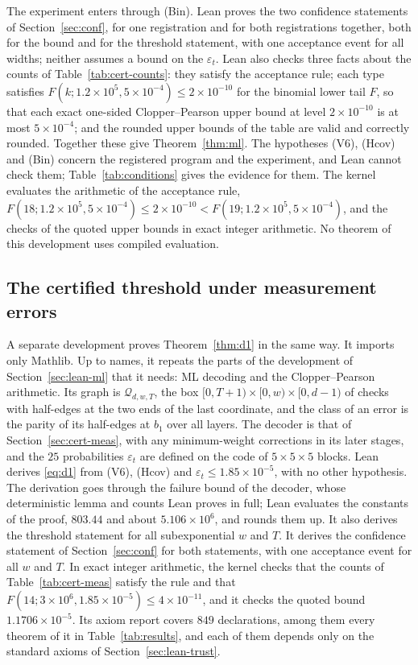 \documentclass[11pt]{amsart}
\theoremstyle{definition}
\theoremstyle{remark}
\numberwithin{equation}{section}
\begin{document}
The experiment enters through (Bin). Lean proves the two confidence statements of Section~\ref{sec:conf}, for one registration and for both registrations together, both for the bound and for the threshold statement, with one acceptance event for all widths; neither assumes a bound on the $\varepsilon_t$. Lean also checks three facts about the counts of Table~\ref{tab:cert-counts}: they satisfy the acceptance rule; each type satisfies $F(k;1.2\times10^{5},5\times10^{-4})\le2\times10^{-10}$ for the binomial lower tail $F$, so that each exact one-sided Clopper--Pearson upper bound at level $2\times10^{-10}$ is at most $5\times10^{-4}$; and the rounded upper bounds of the table are valid and correctly rounded. Together these give Theorem~\ref{thm:ml}. The hypotheses (V6), (Hcov) and (Bin) concern the registered program and the experiment, and Lean cannot check them; Table~\ref{tab:conditions} gives the evidence for them. The kernel evaluates the arithmetic of the acceptance rule,
$F(18;1.2\times10^{5},5\times10^{-4})\le2\times10^{-10}<F(19;1.2\times10^{5},5\times10^{-4})$, and the checks of the
quoted upper bounds in exact integer arithmetic. No theorem of this development uses compiled evaluation.

\subsection{The certified threshold under measurement errors}\label{sec:lean-d1}

A separate development proves Theorem~\ref{thm:d1} in the same way. It imports only Mathlib. Up to names, it repeats the parts of the development of Section~\ref{sec:lean-ml} that it needs: ML decoding and the Clopper--Pearson arithmetic. Its graph is $\mathcal Q_{d,w,T}$, the box $[0,T+1)\times[0,w)\times[0,d-1)$ of checks
with half-edges at the two ends of the last coordinate, and the class of an error is the parity of its half-edges at
$b_1$ over all layers. The decoder is that of Section~\ref{sec:cert-meas}, with any minimum-weight corrections in its later
stages, and the $25$ probabilities $\varepsilon_t$ are defined on the code of $5\times5\times5$ blocks. Lean derives \eqref{eq:d1} from (V6),
(Hcov) and $\varepsilon_t\le1.85\times10^{-5}$, with no other hypothesis. The derivation goes through the failure bound of the decoder, whose deterministic lemma
and counts Lean proves in full; Lean evaluates the constants of the proof, $803.44$ and about $5.106\times10^{6}$, and
rounds them up. It also derives the threshold statement for all subexponential $w$ and $T$. It derives the confidence statement of
Section~\ref{sec:conf} for both statements, with one acceptance event for all $w$ and $T$. In exact integer arithmetic, the kernel checks that the counts of Table~\ref{tab:cert-meas} satisfy the rule and that
$F(14;3\times10^{6},1.85\times10^{-5})\le4\times10^{-11}$, and it checks the quoted bound
$1.1706\times10^{-5}$. Its axiom report covers $849$ declarations, among them every theorem of it in Table~\ref{tab:results}, and each
of them depends only on the standard axioms of Section~\ref{sec:lean-trust}.
\end{document}
